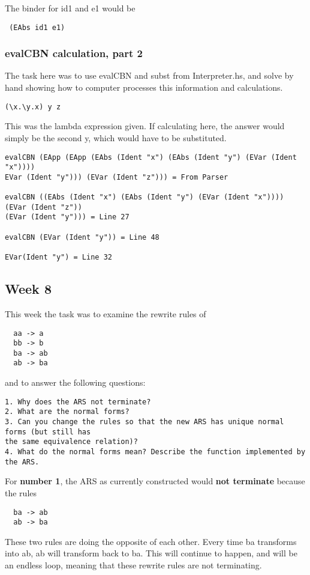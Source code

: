\documentclass{article}
\theoremstyle{theorem}
\theoremstyle{definition}
\theoremstyle{remark}
\begin{document}
\noindent\newline The binder for id1 and e1 would be \begin{verbatim} (EAbs id1 e1) \end{verbatim}

\subsubsection{evalCBN calculation, part 2}

\noindent The task here was to use evalCBN and subst from Interpreter.hs, and solve by hand showing how to computer processes this information and calculations.

\begin{verbatim}
(\x.\y.x) y z
\end{verbatim}

This was the lambda expression given. If calculating here, the answer would simply be the second y, which would have to be substituted.

\begin{verbatim}
evalCBN (EApp (EApp (EAbs (Ident "x") (EAbs (Ident "y") (EVar (Ident "x")))) 
EVar (Ident "y"))) (EVar (Ident "z"))) = From Parser

evalCBN ((EAbs (Ident "x") (EAbs (Ident "y") (EVar (Ident "x")))) (EVar (Ident "z")) 
(EVar (Ident "y"))) = Line 27

evalCBN (EVar (Ident "y")) = Line 48

EVar(Ident "y") = Line 32
\end{verbatim}

\subsection{Week 8}
This week the task was to examine the rewrite rules of
\begin{verbatim}
  aa -> a
  bb -> b
  ba -> ab
  ab -> ba
\end{verbatim}
and to answer the following questions:
\begin{verbatim}
1. Why does the ARS not terminate?
2. What are the normal forms?
3. Can you change the rules so that the new ARS has unique normal forms (but still has 
the same equivalence relation)?
4. What do the normal forms mean? Describe the function implemented by the ARS.
\end{verbatim}
\noindent For \textbf{number 1}, the ARS as currently constructed would \textbf{not terminate} because the rules 
\begin{verbatim}
  ba -> ab
  ab -> ba
\end{verbatim}
\noindent These two rules are doing the opposite of each other. Every time ba transforms into ab, ab will transform back to ba. This will continue to happen, and will be an endless loop, meaning that these rewrite rules are not terminating.
\end{document}
